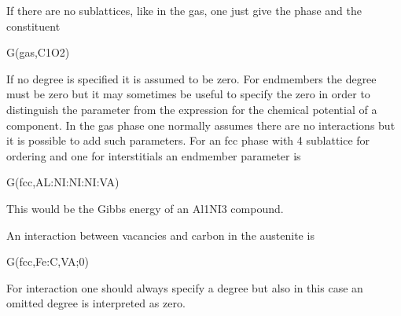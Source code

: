 \documentclass[12pt]{article}
\begin{document}
If there are no sublattices, like in the gas, one just give the phase
and the constituent

G(gas,C1O2)

If no degree is specified it is assumed to be zero.  For endmembers
the degree must be zero but it may sometimes be useful to specify the
zero in order to distinguish the parameter from the expression for the
chemical potential of a component.  In the gas phase one normally
assumes there are no interactions but it is possible to add such
parameters.  For an fcc phase with 4 sublattice for ordering and one
for interstitials an endmember parameter is

G(fcc,AL:NI:NI:NI:VA)

This would be the Gibbs energy of an Al1NI3 compound.

An interaction between vacancies and carbon in the austenite is

G(fcc,Fe:C,VA;0)

For interaction one should always specify a degree but also in this
case an omitted degree is interpreted as zero.
\end{document}
